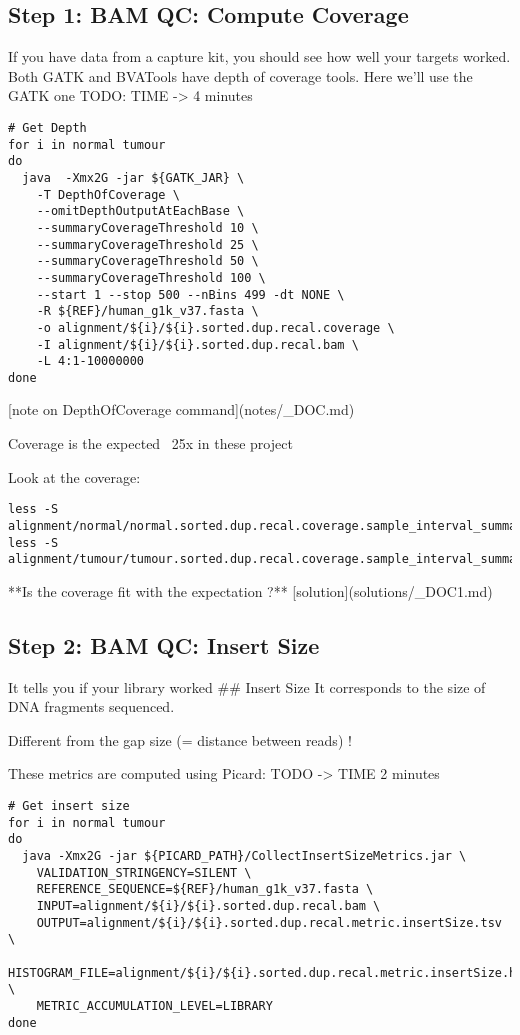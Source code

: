 \subsection{Step 1: BAM QC: Compute Coverage}
If you have data from a capture kit, you should see how well your targets worked. Both GATK and BVATools have depth of coverage tools. 
Here we'll use the GATK one
TODO: TIME -> 4 minutes
\begin{lstlisting}
# Get Depth
for i in normal tumour
do
  java  -Xmx2G -jar ${GATK_JAR} \
    -T DepthOfCoverage \
    --omitDepthOutputAtEachBase \
    --summaryCoverageThreshold 10 \
    --summaryCoverageThreshold 25 \
    --summaryCoverageThreshold 50 \
    --summaryCoverageThreshold 100 \
    --start 1 --stop 500 --nBins 499 -dt NONE \
    -R ${REF}/human_g1k_v37.fasta \
    -o alignment/${i}/${i}.sorted.dup.recal.coverage \
    -I alignment/${i}/${i}.sorted.dup.recal.bam \
    -L 4:1-10000000
done
\end{lstlisting}
[note on DepthOfCoverage command](notes/_DOC.md)

Coverage is the expected ~25x in these project

Look at the coverage:

\begin{lstlisting}
less -S alignment/normal/normal.sorted.dup.recal.coverage.sample_interval_summary
less -S alignment/tumour/tumour.sorted.dup.recal.coverage.sample_interval_summary
\end{lstlisting}

**Is the coverage fit with the expectation ?** [solution](solutions/_DOC1.md)

\subsection{Step 2: BAM QC: Insert Size}
It tells you if your library worked
## Insert Size
It corresponds to the size of DNA fragments sequenced.

Different from the gap size (= distance between reads) !

These metrics are computed using Picard:
TODO -> TIME 2 minutes
\begin{lstlisting}
# Get insert size
for i in normal tumour
do
  java -Xmx2G -jar ${PICARD_PATH}/CollectInsertSizeMetrics.jar \
    VALIDATION_STRINGENCY=SILENT \
    REFERENCE_SEQUENCE=${REF}/human_g1k_v37.fasta \
    INPUT=alignment/${i}/${i}.sorted.dup.recal.bam \
    OUTPUT=alignment/${i}/${i}.sorted.dup.recal.metric.insertSize.tsv \
    HISTOGRAM_FILE=alignment/${i}/${i}.sorted.dup.recal.metric.insertSize.histo.pdf \
    METRIC_ACCUMULATION_LEVEL=LIBRARY
done
\end{lstlisting}

